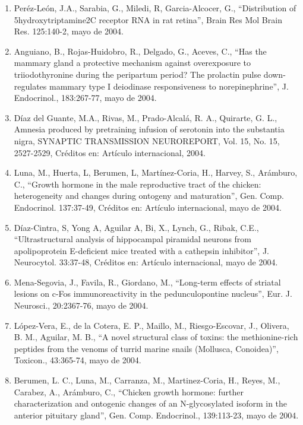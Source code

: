 \begin{enumerate}
\item Peréz-León, J.A., Sarabia, G., Miledi, R, Garcia-Alcocer, G., “Distribution of 5hydroxytriptamine2C receptor RNA in rat retina”, Brain 
Res 
Mol Brain Res. 125:140-2, mayo de 2004.

\item Anguiano, B., Rojas-Huidobro, R., Delgado, G., Aceves, C., “Has the mammary gland a protective mechanism against overexposure to 
triiodothyronine during the peripartum period? The prolactin pulse down-regulates mammary type I deiodinase responsiveness to 
norepinephrine”, J. Endocrinol., 183:267-77, mayo de 2004.

\item Díaz del Guante, M.A., Rivas, M., Prado-Alcalá, R. A., Quirarte, G. L., Amnesia produced by pretraining infusion of serotonin into the 
substantia nigra, SYNAPTIC TRANSMISSION NEUROREPORT, Vol. 15, No. 15, 2527-2529, Créditos en: Artículo internacional, 2004.

\item Luna, M., Huerta, L, Berumen, L, Martínez-Coria, H., Harvey, S., Arámburo, C., “Growth hormone in the male reproductive tract of the 
chicken: 
heterogeneity and changes during ontogeny and maturation”, Gen. Comp. Endocrinol. 137:37-49, Créditos en: Artículo internacional, mayo de 
2004.

\item Díaz-Cintra, S, Yong A, Aguilar A, Bi, X., Lynch, G., Ribak, C.E., “Ultrastructural analysis of hippocampal piramidal neurons from 
apolipoprotein E-deficient mice treated with a cathepsin inhibitor”, J. Neurocytol. 33:37-48, Créditos en: Artículo internacional, mayo de 
2004.

\item Mena-Segovia, J., Favila, R., Giordano, M., “Long-term effects of striatal lesions on c-Fos immunoreactivity in the pedunculopontine 
nucleus”, Eur. J. Neurosci., 20:2367-76, mayo de 2004.

\item López-Vera, E., de la Cotera, E. P., Maillo, M., Riesgo-Escovar, J., Olivera, B. M., Aguilar, M. B., “A novel structural class of 
toxins: the 
methionine-rich peptides from the venoms of turrid marine snails (Mollusca, Conoidea)”, Toxicon., 43:365-74, mayo de 2004.

\item Berumen, L. C., Luna, M., Carranza, M., Martinez-Coria, H., Reyes, M., Carabez, A., Arámburo, C., “Chicken growth hormone: further 
characterization and ontogenic changes of an N-glycosylated isoform in the anterior pituitary gland”, Gen. Comp. Endocrinol., 139:113-23, 
mayo de 2004.


\end{enumerate}
